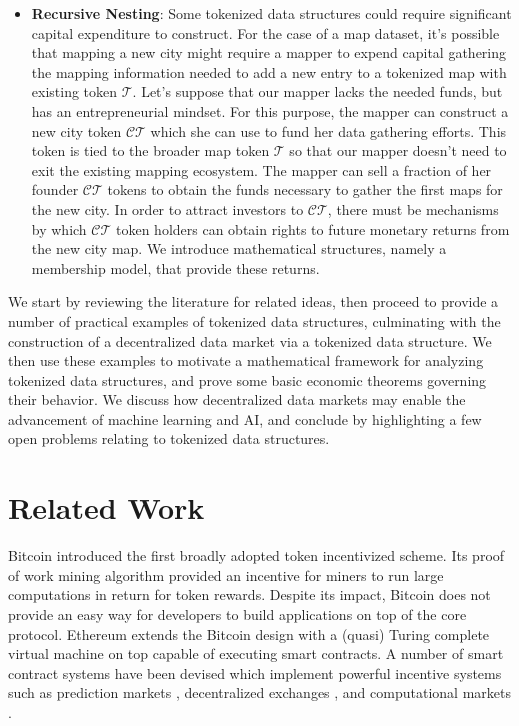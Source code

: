 \documentclass{llncs}
\begin{document}
\begin{itemize}
\item \textbf{Recursive Nesting}: Some tokenized data structures could require significant capital expenditure to construct. For the case of a map dataset, it’s possible that mapping a new city might require a mapper to expend capital gathering the mapping information needed to add a new entry to a tokenized map with existing token $\mathcal{T}$. Let's suppose that our mapper lacks the needed funds, but has an entrepreneurial mindset. For this purpose, the mapper can construct a new city token $\mathcal{CT}$ which she can use to fund her data gathering efforts. This token is tied to the broader map token $\mathcal{T}$ so that our mapper doesn't need to exit the existing mapping ecosystem. The mapper can sell a fraction of her founder $\mathcal{CT}$ tokens to obtain the funds necessary to gather the first maps for the new city. In order to attract investors to $\mathcal{CT}$, there must be mechanisms by which $\mathcal{CT}$ token holders can obtain rights to future monetary returns from the new city map. We introduce mathematical structures, namely a membership model, that provide these returns. 
\end{itemize}

We start by reviewing the literature for related ideas, then proceed to provide a number of practical examples of tokenized data structures, culminating with the construction of a decentralized data market via a tokenized data structure. We then use these examples to motivate a mathematical framework for analyzing tokenized data structures, and prove some basic economic theorems governing their behavior. We discuss how decentralized data markets may enable the advancement of machine learning and AI, and conclude by highlighting a few open problems relating to tokenized data structures.

\section{Related Work}

Bitcoin \cite{nakamoto2008bitcoin} introduced the first broadly adopted token incentivized scheme. Its proof of work mining algorithm provided an incentive for miners to run large computations in return for token rewards. Despite its impact, Bitcoin does not provide an easy way for developers to build applications on top of the core protocol. Ethereum \cite{buterin2013ethereum} extends the Bitcoin design with a (quasi) Turing complete virtual machine on top \cite{wood2014ethereum} capable of executing smart contracts. A number of smart contract systems have been devised which implement powerful incentive systems such as prediction markets \cite{peterson2015augur}, decentralized exchanges \cite{warren20170x}, and computational markets \cite{teutsch2017scalable}.
\end{document}
